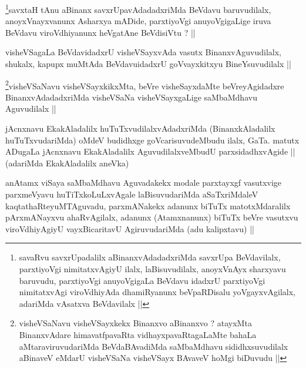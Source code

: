 \begin{artha}
\footnote[2]{savaRvu savxrUpadalilx aBinanxvAdadadxriMda savxrUpa
  BeVdavilalx, parxtiyoVgi nimitatxvAgiyU ilalx, laBisuvudilalx,
  anoyxVnAyx sharxyavu baruvudu, parxtiyoVgi anuyoVgigaLa BeVdavu
  idadxrU parxtiyoVgi nimitatxvAgi viroVdhiyAda dhamiRyanunx
  beVpaRDisalu yoVgayxvAgilalx, adariMda vAsatxva BeVdavilalx ||}savxtaH tAnu aBinanx savxrUpavAdadadxriMda BeVdavu baruvudilalx,
anoyxVnayxvanunx Asharxya mADide, parxtiyoVgi anuyoVgigaLige iruva
BeVdavu viroVdhiyanunx heVgatAne BeVdisiVtu ? ||
\end{artha}


\begin{artha}
visheVSagaLa BeVdavidadxrU visheVSayxvAda vasutx BinanxvAguvudilalx,
shukalx, kapupx muMtAda BeVdavuidadxrU goVvayxkitxyu BineYsuvudilalx ||
\end{artha}


\begin{artha}
\footnote[1]{visheVSaNavu visheVSayxkekx Binanxvo aBinanxvo ? atayxMta
BinanxvAdare himavatfpavaRta vidhayxpavaRtagaLaMte bahaLa
aMtaraviruvudariMda BeVdaBAvadiMda saMbaMdhavu sididhxsuvudilalx
aBinaveV eMdarU visheVSaNa visheVSayx BAvaveV hoMgi biDuvudu ||}visheVSaNavu visheVSayxkikxMta, beVre visheSayxdaMte
beVreyAgidadxre BinanxvAdadadxriMda visheVSaNa visheVSayxgaLige
saMbaMdhavu Aguvudilalx ||
\end{artha}


\begin{artha}
jAcnxnavu EkakAladalilx huTuTxvudilalxvAdadxriMda (BinanxkAladalilx
huTuTxvudariMda) oMdeV budidhxge goVcarisuvudeMbudu ilalx,
GaTa. matutx ADugaLa jAcnxnavu EkakAladalilx AguvudilalxveMbudU
parxsidadhxvAgide || (adariMda EkakAladalilx aneVka)
\end{artha}


\begin{artha}
anAtamx viSaya saMbaMdhavu Aguvadakekx modale parxtayxgf vasutxvige
parxmeVyavu huTiTxkoLuLxvAgale laBisuvudariMda aSaTxriMdaleV
kaqtathaRteyuMTAguvadu, parxmANakekx adanunx biTuTx matotxMdaralilx
pArxmANayxvu ahaRvAgilalx, adanunx (Atamxnanunx) biTuTx beVre vasutxvu
viroVdhiyAgiyU vayxBicaritavU AgiruvudariMda (adu kalipxtavu) ||
\end{artha}

